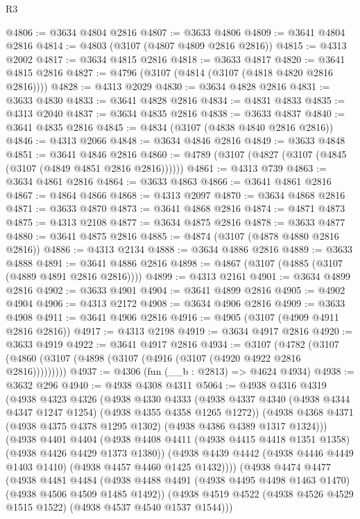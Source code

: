 \begin{lexlean}{R3}
\begin{coremodule}
@4806 := @3634 @4804 @2816
@4807 := @3633 @4806
@4809 := @3641 @4804 @2816
@4814 := @4803 (@3107 (@4807 @4809 @2816 @2816))
@4815 := @4313 @2002
@4817 := @3634 @4815 @2816
@4818 := @3633 @4817
@4820 := @3641 @4815 @2816
@4827 := @4796 (@3107 (@4814 (@3107 (@4818 @4820 @2816 @2816))))
@4828 := @4313 @2029
@4830 := @3634 @4828 @2816
@4831 := @3633 @4830
@4833 := @3641 @4828 @2816
@4834 := @4831 @4833
@4835 := @4313 @2040
@4837 := @3634 @4835 @2816
@4838 := @3633 @4837
@4840 := @3641 @4835 @2816
@4845 := @4834 (@3107 (@4838 @4840 @2816 @2816))
@4846 := @4313 @2066
@4848 := @3634 @4846 @2816
@4849 := @3633 @4848
@4851 := @3641 @4846 @2816
@4860 := @4789 (@3107 (@4827 (@3107 (@4845 (@3107 (@4849 @4851 @2816 @2816))))))
@4861 := @4313 @739
@4863 := @3634 @4861 @2816
@4864 := @3633 @4863
@4866 := @3641 @4861 @2816
@4867 := @4864 @4866
@4868 := @4313 @2097
@4870 := @3634 @4868 @2816
@4871 := @3633 @4870
@4873 := @3641 @4868 @2816
@4874 := @4871 @4873
@4875 := @4313 @2108
@4877 := @3634 @4875 @2816
@4878 := @3633 @4877
@4880 := @3641 @4875 @2816
@4885 := @4874 (@3107 (@4878 @4880 @2816 @2816))
@4886 := @4313 @2134
@4888 := @3634 @4886 @2816
@4889 := @3633 @4888
@4891 := @3641 @4886 @2816
@4898 := @4867 (@3107 (@4885 (@3107 (@4889 @4891 @2816 @2816))))
@4899 := @4313 @2161
@4901 := @3634 @4899 @2816
@4902 := @3633 @4901
@4904 := @3641 @4899 @2816
@4905 := @4902 @4904
@4906 := @4313 @2172
@4908 := @3634 @4906 @2816
@4909 := @3633 @4908
@4911 := @3641 @4906 @2816
@4916 := @4905 (@3107 (@4909 @4911 @2816 @2816))
@4917 := @4313 @2198
@4919 := @3634 @4917 @2816
@4920 := @3633 @4919
@4922 := @3641 @4917 @2816
@4934 := @3107
    (@4782 (@3107 (@4860 (@3107 (@4898 (@3107 (@4916 (@3107 (@4920 @4922 @2816 @2816)))))))))
@4937 := @4306 (fun (__b : @2813) => @4624 @4934)
@4938 := @3632 @296
@4940 := @4938 @4308 @4311
@5064 := @4938
    @4316
    @4319
    (@4938
      @4323
      @4326
      (@4938
        @4330
        @4333
        (@4938 @4337 @4340 (@4938 @4344 @4347 @1247 @1254) (@4938 @4355 @4358 @1265 @1272))
        (@4938 @4368 @4371 (@4938 @4375 @4378 @1295 @1302) (@4938 @4386 @4389 @1317 @1324)))
      (@4938
        @4401
        @4404
        (@4938 @4408 @4411 (@4938 @4415 @4418 @1351 @1358) (@4938 @4426 @4429 @1373 @1380))
        (@4938 @4439 @4442 (@4938 @4446 @4449 @1403 @1410) (@4938 @4457 @4460 @1425 @1432))))
    (@4938
      @4474
      @4477
      (@4938
        @4481
        @4484
        (@4938 @4488 @4491 (@4938 @4495 @4498 @1463 @1470) (@4938 @4506 @4509 @1485 @1492))
        (@4938 @4519 @4522 (@4938 @4526 @4529 @1515 @1522) (@4938 @4537 @4540 @1537 @1544)))

\end{coremodule}
\end{lexlean}
